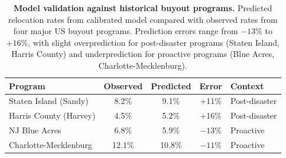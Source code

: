 \documentclass[11pt,letterpaper]{article}
\theoremstyle{definition}
\begin{document}

\begin{table}[p]
\centering
\caption{\textbf{Model validation against historical buyout programs.} Predicted relocation rates from calibrated model compared with observed rates from four major US buyout programs. Prediction errors range from $-13$\% to $+16$\%, with slight overprediction for post-disaster programs (Staten Island, Harris County) and underprediction for proactive programs (Blue Acres, Charlotte-Mecklenburg).}
\label{tab:validation}
\begin{tabular}{lcccl}
\toprule
Program & Observed & Predicted & Error & Context \\
\midrule
Staten Island (Sandy) & 8.2\% & 9.1\% & +11\% & Post-disaster \\
Harris County (Harvey) & 4.5\% & 5.2\% & +16\% & Post-disaster \\
NJ Blue Acres & 6.8\% & 5.9\% & $-13$\% & Proactive \\
Charlotte-Mecklenburg & 12.1\% & 10.8\% & $-11$\% & Proactive \\
\bottomrule
\end{tabular}
\end{table}
\end{document}
